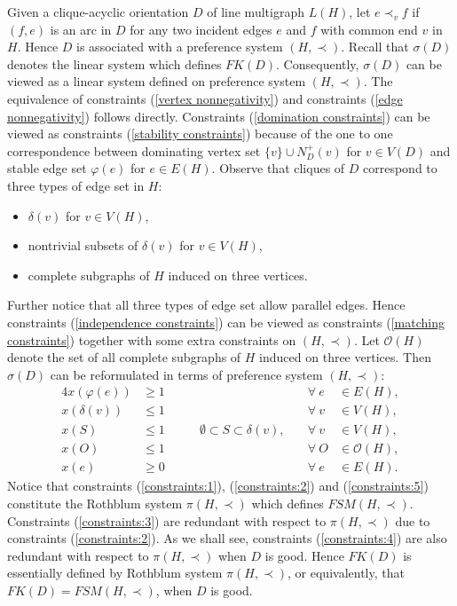 \documentclass[11pt]{article}
\numberwithin{theorem}{section}
\begin{document}
Given a clique-acyclic orientation $D$ of line multigraph $L(H)$,
let $e\prec_v f$ if $(f,e)$ is an arc in $D$ for any two incident edges $e$ and $f$ with common end $v$ in $H$.
Hence $D$ is associated with a preference system $(H,\prec)$.
Recall that $\sigma(D)$ denotes the linear system which defines $FK(D)$.
Consequently, $\sigma(D)$ can be viewed as a linear system defined on preference system $(H,\prec)$.
The equivalence of constraints (\ref{vertex nonnegativity}) and constraints (\ref{edge nonnegativity}) follows directly. Constraints (\ref{domination constraints}) can be viewed as constraints (\ref{stability constraints}) because of the one to one correspondence between dominating vertex set $\{v\}\cup N^+_D(v)$ for $v\in V(D)$ and stable edge set $\varphi(e)$ for $e\in E(H)$.
Observe that cliques of $D$ correspond to three types of edge set in $H$:
\begin{itemize}
\item $\delta(v)$ for $v\in V(H)$,
\item nontrivial subsets of $\delta(v)$ for $v\in V(H)$,
\item complete subgraphs of $H$ induced on three vertices.
\end{itemize}
Further notice that all three types of edge set allow parallel edges.
Hence constraints (\ref{independence constraints}) can be viewed as constraints (\ref{matching constraints}) together with some extra constraints on $(H,\prec)$. Let $\mathcal{O}(H)$ denote the set of all complete subgraphs of $H$ induced on three vertices.
Then $\sigma(D)$ can be reformulated in terms of preference system $(H,\prec)$:
\begin{alignat}{4}
x(\varphi(e)) &\geq 1 &\qquad &\forall ~e &\in E(H),\label{constraints:1}\\
x(\delta(v)) &\leq 1 &\qquad &\forall ~v &\in V(H),\label{constraints:2}\\
x(S) &\leq 1 &\qquad \emptyset\subset S\subset \delta(v),\quad &\forall ~v&\in V(H),\label{constraints:3}\\
x(O) &\leq 1 &\qquad &\forall ~O&\in \mathcal{O}(H),\label{constraints:4}\\
x(e) &\geq 0 &\qquad &\forall ~e &\in E(H)\label{constraints:5}.
\end{alignat}
Notice that constraints (\ref{constraints:1}), (\ref{constraints:2}) and (\ref{constraints:5}) constitute the Rothblum system $\pi(H,\prec)$ which defines $FSM(H,\prec)$. Constraints (\ref{constraints:3}) are redundant with respect to $\pi(H,\prec)$ due to constraints (\ref{constraints:2}). As we shall see, constraints (\ref{constraints:4}) are also redundant with respect to $\pi(H,\prec)$ when $D$ is good. Hence $FK(D)$ is essentially defined by Rothblum system $\pi(H,\prec)$, or equivalently, that $FK(D)=FSM(H,\prec)$, when $D$ is good.
\end{document}
